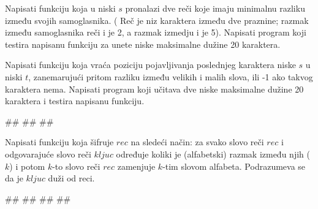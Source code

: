 \begin{Exercise}[label=p2.3_] 
Napisati funkciju
 koja u niski $s$ pronalazi dve reči koje imaju minimalnu razliku između
svojih samoglasnika.  ( Reč je niz karaktera između dve praznine;
razmak između samoglasnika reči  i  je 2,
a razmak izmedju  i  je 5). Napisati program koji testira napisanu funkciju za unete niske maksimalne dužine 20 karaktera.

\end{Exercise}
\begin{Answer}[ref=p2.3_]
\end{Answer}


\begin{Exercise}[label=p2.3_] 
Napisati funkciju  koja vraća poziciju pojavljivanja poslednjeg karaktera niske $s$ u niski $t$, zanemarujući pritom razliku između velikih i
malih slova, ili -1 ako takvog karaktera nema. Napisati program koji učitava dve niske maksimalne dužine 20 karaktera i testira napisanu funkciju.


\begin{miditest}
\begin{upotreba}{1}
#\naslovInt#
##
##
\end{upotreba}
\end{miditest}
\end{Exercise}
\begin{Answer}[ref=p2.3_]
\end{Answer}





\begin{Exercise}[label=p2.3_] 
Napisati funkciju  koja šifruje $rec$ na sledeći način: za svako slovo reči
$rec$ i odgovarajuće slovo reči $kljuc$ određuje koliki je
(alfabetski) razmak između njih ($k$) i potom  $k$-to slovo reči $rec$ zamenjuje $k$-tim slovom alfabeta. Podrazumeva se da je $kljuc$ duži od reci. 


\begin{miditest}
\begin{upotreba}{1}
#\naslovInt#
##
##
##
\end{upotreba}
\end{miditest}
\end{Exercise}
\begin{Answer}[ref=p2.3_]
\end{Answer}

\begin{comment}

\end{comment}


